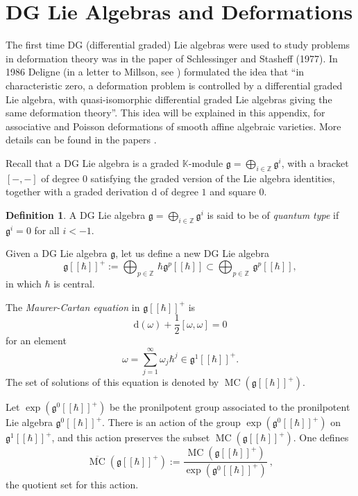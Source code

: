 \documentclass{conm-p-l}
\theoremstyle{definition}
\newtheorem{dfn}[equation]{Definition}
\numberwithin{equation}{section}
\newcommand{\ol}{\overline}
\newcommand{\opn}{\operatorname}
\newcommand{\mfrak}[1]{\mathfrak{#1}}
\newcommand{\mrm}[1]{\mathrm{#1}}
\newcommand{\mbb}[1]{\mathbb{#1}}
\newcommand{\boplus}{\bigoplus\nolimits}
\newcommand{\K}{\mbb{K}}
\newcommand{\g}{\mfrak{g}}
\newcommand{\smfrac}[2]{\textstyle \frac{#1}{#2}}
\begin{document}
\appendix

\section{DG Lie Algebras and Deformations}

The first time DG (differential graded) Lie algebras were used to study
problems in deformation theory was in the paper \cite{SS} of Schlessinger and
Stasheff (1977). In 1986 Deligne (in a letter to Millson, see \cite{GM})
formulated the idea that ``in characteristic zero, a deformation problem is
controlled by a differential graded Lie algebra, with quasi-isomorphic
differential graded Lie algebras giving the same deformation theory''.
This idea will be explained in this appendix, for associative and
Poisson deformations of smooth affine algebraic varieties. More details can be
found in the papers \cite{Ye1, Ye5}. 

Recall that a DG Lie algebra is a graded $\K$-module 
$\mfrak{g} = \boplus_{i \in \mbb{Z}} \mfrak{g}^{i}$,
with a bracket $[-, -]$ of degree $0$
satisfying the graded version of the Lie algebra identities, 
together with a graded derivation $\mrm{d}$ 
of degree $1$ and square $0$.

\begin{dfn}
A DG Lie algebra $\mfrak{g} = \boplus_{i \in \mbb{Z}} \mfrak{g}^{i}$
is said to be of {\em quantum type} if $\g^i = 0$ for all $i < -1$.
\end{dfn}

Given a DG Lie algebra $\mfrak{g}$, let us define a new DG Lie algebra 
\[ \mfrak{g}[[\hbar]]^+ := 
\bigoplus_{p \in \mbb{Z}} \, \hbar \mfrak{g}^{p}[[\hbar]] \subset
\bigoplus_{p \in \mbb{Z}} \, \mfrak{g}^{p}[[\hbar]] , \] 
in which $\hbar$ is central.

The {\em Maurer-Cartan equation} in 
$\mfrak{g}[[\hbar]]^+$ is
\[ \mrm{d}(\omega) + \smfrac{1}{2} [\omega, \omega] = 0 \]
for an element
\[ \omega = \sum_{j = 1}^{\infty} \omega_j \hbar^j
\in \mfrak{g}^{1}[[\hbar]]^+ . \]
The set of solutions of this equation is denoted by
$\opn{MC}(\mfrak{g}[[\hbar]]^+)$.

Let $\opn{exp}(\mfrak{g}^{0}[[\hbar]]^+)$
be the pronilpotent group associated to the pronilpotent Lie
algebra $\mfrak{g}^{0}[[\hbar]]^+$. 
There is an action of the group 
$\opn{exp}(\mfrak{g}^{0}[[\hbar]]^+)$ on 
$\mfrak{g}^{1}[[\hbar]]^+$, and this action preserves the subset 
$\opn{MC}(\mfrak{g}[[\hbar]]^+)$. One defines
\begin{equation} \label{eqn:MC}
\ol{\opn{MC}}(\mfrak{g}[[\hbar]]^+) := 
\frac{ \opn{MC}(\mfrak{g}[[\hbar]]^+) }{ 
\opn{exp}(\mfrak{g}^{0}[[\hbar]]^+) } \ ,
\end{equation}
the quotient set for this action.
\end{document}
